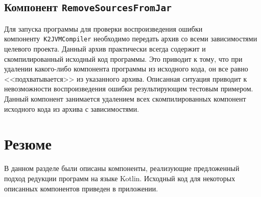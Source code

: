 \subsection{Компонент \texttt{RemoveSourcesFromJar}}
Для запуска программы для проверки воспроизведения ошибки компоненту~\texttt{K2JVMCompiler} необходимо передать архив со всеми зависимостями целевого проекта. Данный архив практически всегда содержит и скомпилированный исходный код программы. Это приводит к тому, что при удалении какого-либо компонента программы из исходного кода, он все равно <<подхватывается>> из указанного архива. Описанная ситуация приводит к невозможности воспроизведения ошибки результирующим тестовым примером. Данный компонент занимается удалением всех скомпилированных компонент исходного кода из архива с зависимостями.

\section{Резюме}
В данном разделе были описаны компоненты, реализующие предложенный подход редукции программ на языке Kotlin. Исходный код для некоторых описанных компонентов приведен в приложении.